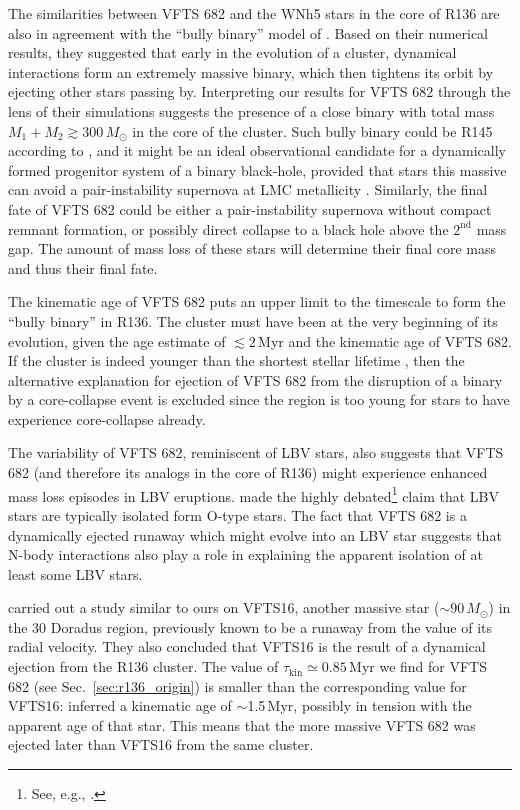 \documentclass[apjl,twocolumn]{emulateapj}
\DeclareRobustCommand{\Secref}[1]{Sec.~\ref{#1}}
\begin{document}
The similarities between VFTS 682 and the WNh5 stars in the core of
R136 are also in agreement with the ``bully binary'' model of
\cite{fujii:11}. Based on their numerical results, they suggested that
early in the evolution of a cluster, dynamical interactions form an extremely
massive binary, which then tightens its orbit by ejecting other stars passing
by. Interpreting our results for VFTS 682 through the lens of their simulations
suggests the presence of a close binary with total mass
$M_1+M_2\gtrsim 300\,M_\odot$ in the core of the cluster. Such bully
binary could be R145 according to \cite{fujii:11}, and it might be an
ideal observational candidate for a dynamically formed progenitor system of
a binary black-hole, provided that stars this massive can avoid a
pair-instability supernova \cite[][]{fowler:64, rakavy:67} at LMC
metallicity \citep[see also][]{langer:07}. Similarly, the final fate of VFTS 682 could be either a
pair-instability supernova without compact remnant formation, or
possibly direct collapse to a black hole above the $2^\mathrm{nd}$
mass gap. The amount of mass loss of these stars will determine their final core
mass and thus their final fate.

The kinematic age of VFTS 682 puts an
upper limit to the timescale to form the ``bully binary'' in
R136. The cluster must have been at the very beginning of its
evolution, given the age estimate of $\lesssim 2$\,Myr
\citep[][]{crowther:10,sabbi:12} and the kinematic age of VFTS 682. If the
cluster is indeed younger than the shortest stellar lifetime
\citep[$\sim$3\,Myr, e.g.,][]{zapartas:17}, then the alternative
explanation for ejection of VFTS 682 from the disruption of a binary
by a core-collapse event is excluded since the region is too young for stars
to have experience core-collapse already.
 
The variability of VFTS 682, reminiscent of LBV stars, also suggests
that VFTS 682 (and therefore its analogs in the core of R136) might
experience enhanced mass loss episodes in LBV eruptions. \citet{smith:15} made the highly
debated\footnote{See, e.g., \cite{humphreys:16, davidson:16, smith:16}.}
claim that LBV stars are typically isolated form O-type stars. The fact that VFTS 682 is a dynamically
ejected runaway which might evolve into an LBV star suggests that
N-body interactions also play a role in explaining the apparent
isolation of at least some LBV stars. 

\citet{lennon:18} carried out a study similar to ours on VFTS16, another
massive star ($\sim$$90\,M_\odot$) in the 30 Doradus region, previously
known to be a runaway from the value of
its radial velocity. They also concluded that VFTS16 is 
the result of a dynamical ejection from the R136 cluster. 
The value of $\tau_\mathrm{kin}\simeq0.85$\,Myr we find for VFTS 682 (see \Secref{sec:r136_origin}) is smaller
than the corresponding value for VFTS16: \cite{lennon:18} inferred a kinematic age of
$\sim$1.5\,Myr, possibly in tension with the apparent age of that star. This means that the more
massive VFTS 682 was ejected later than VFTS16 from the same cluster.
\end{document}

